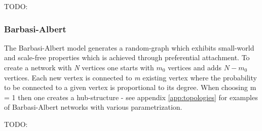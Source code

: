 \documentclass[../Bachelorarbeit.tex]{subfiles}
\begin{document}
TODO: \cite{WattsStrogatz_DynamicsSmallWorld}

\subsubsection{Barbasi-Albert}
The Barbasi-Albert model generates a random-graph which exhibits small-world and scale-free properties which is achieved through preferential attachment. To create a network with \textit{N} vertices one starts with $m_0$ vertices and adds $N - m_0$ vertices. Each new vertex is connected to \textit{m} existing vertex where the probability to be connected to a given vertex is proportional to its degree. When choosing m = 1 then one creates a hub-structure - see appendix \ref{app:topologies} for examples of Barbasi-Albert networks with various parametrization.

TODO: \cite{BarabasiAlbert_EmergenceScaling}
\end{document}
